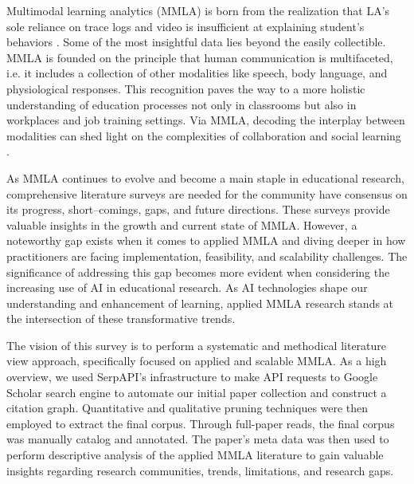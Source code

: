 \documentclass[manuscript,screen,review]{acmart}
\begin{document}
Multimodal learning analytics (MMLA) is born from the realization that LA's sole reliance on trace logs and video is insufficient at explaining student's behaviors \cite{}. Some of the most insightful data lies beyond the easily collectible. MMLA is founded on the principle that human communication is multifaceted, i.e. it includes a collection of other modalities like speech, body language, and physiological responses. This recognition paves the way to a more holistic understanding of education processes not only in classrooms but also in workplaces and job training settings. Via MMLA, decoding the interplay between modalities can shed light on the complexities of collaboration and social learning \cite{}.

As MMLA continues to evolve and become a main staple in educational research, comprehensive literature surveys are needed for the community have consensus on its progress, short--comings, gaps, and future directions. These surveys provide valuable insights in the growth and current state of MMLA. However, a noteworthy gap exists when it comes to applied MMLA and diving deeper in how practitioners are facing implementation, feasibility, and scalability challenges. The significance of addressing this gap becomes more evident when considering the increasing use of AI in educational research. As AI technologies shape our understanding and enhancement of learning, applied MMLA research stands at the intersection of these transformative trends.

The vision of this survey is to perform a systematic and methodical literature view approach, specifically focused on applied and scalable MMLA. As a high overview, we used SerpAPI's infrastructure to make API requests to Google Scholar search engine to automate our initial paper collection and construct a citation graph. Quantitative and qualitative pruning techniques were then employed to extract the final corpus. Through full-paper reads, the final corpus was manually catalog and annotated. The paper's meta data was then used to perform descriptive analysis of the applied MMLA literature to gain valuable insights regarding research communities, trends, limitations, and research gaps. 
\end{document}
